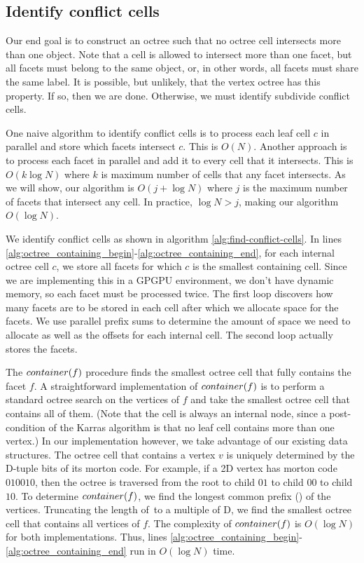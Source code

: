 \documentclass{egpubl}
\begin{document}
\subsection{Identify conflict cells}

Our end goal is to construct an octree such that no octree cell intersects more than one object. Note that a cell is allowed to intersect more than one facet, but all facets must belong to the same object, or, in other words, all facets must share the same label. It is possible, but unlikely, that the vertex octree has this property. If so, then we are done. Otherwise, we must identify subdivide conflict cells.

One naive algorithm to identify conflict cells is to process each leaf cell $c$ in parallel and store which facets intersect $c$. This is $O(N)$. Another approach is to process each facet in parallel and add it to every cell that it intersects. This is $O(k\log{N})$ where $k$ is maximum number of cells that any facet intersects. As we will show, our algorithm is $O(j + \log{N})$ where $j$ is the maximum number of facets that intersect any cell. In practice, $\log{N} > j$, making our algorithm $O(\log{N})$.

We identify conflict cells as shown in algorithm \ref{alg:find-conflict-cells}. In lines \ref{alg:octree_containing_begin}-\ref{alg:octree_containing_end}, for each internal octree cell $c$, we store all facets for which $c$ is the smallest containing cell. Since we are implementing this in a GPGPU environment, we don't have dynamic memory, so each facet must be processed twice. The first loop discovers how many facets are to be stored in each cell after which we allocate space for the facets. We use parallel prefix sums to determine the amount of space we need to allocate as well as the offsets for each internal cell. The second loop actually stores the facets.

The $container(f)$ procedure finds the smallest octree cell that fully contains the facet $f$. A straightforward implementation of $container(f)$ is to perform a standard octree search on the vertices of $f$ and take the smallest octree cell that contains all of them. (Note that the cell is always an internal node, since a post-condition of the Karras algorithm is that no leaf cell contains more than one vertex.) In our implementation however, we take advantage of our existing data structures. The octree cell that contains a vertex $v$ is uniquely determined by the D-tuple bits of its morton code. For example, if a 2D vertex has morton code $010010$, then the octree is traversed from the root to child $01$ to child $00$ to child $10$. To determine $container(f)$, we find the longest common prefix (\lcp) of the vertices. Truncating the length of \lcp\,to a multiple of D, we find the smallest octree cell that contains all vertices of $f$. The complexity of $container(f)$ is $O(\log{N})$ for both implementations. Thus, lines \ref{alg:octree_containing_begin}-\ref{alg:octree_containing_end} run in $O(\log{N})$ time.
\end{document}
